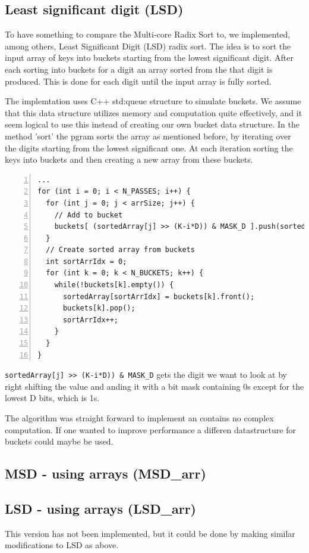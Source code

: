 \subsection{Least significant digit (LSD)}
To have something to compare the Multi-core Radix Sort to, we implemented, among others, Least Significant Digit (LSD) radix sort. 
The idea is to sort the input array of keys into buckets starting from the lowest significant digit. After each sorting into buckets for a digit an array sorted from the that digit is produced. 
This is done for each digit until the input array is fully sorted. 

The implemtation uses C++ std:queue structure to simulate buckets. We assume that this data structure utilizes memory and computation quite effectively, and it seem logical to use this instead of creating our own bucket data structure.
In the method 'sort' the pgram sorts the array as mentioned before, by iterating over the digits starting from the lowest significant one. At each iteration sorting the keys into buckets and then creating a new array from these buckets.
\begin{lstlisting}[numbers=left]
...
for (int i = 0; i < N_PASSES; i++) {
  for (int j = 0; j < arrSize; j++) {
    // Add to bucket
    buckets[ (sortedArray[j] >> (K-i*D)) & MASK_D ].push(sortedArray[j]);
  }
  // Create sorted array from buckets
  int sortArrIdx = 0;
  for (int k = 0; k < N_BUCKETS; k++) {
    while(!buckets[k].empty()) {
      sortedArray[sortArrIdx] = buckets[k].front();
      buckets[k].pop();
      sortArrIdx++;
    }
  }
}
\end{lstlisting}
\verb!sortedArray[j] >> (K-i*D)) & MASK_D! gets the digit we want to look at by right shifting the value and anding it with a bit mask containing 0s except for the lowest D bits, which is 1s.

The algorithm was straight forward to implement an contains no complex computation. If one wanted to improve performance a differen datastructure for buckets could maybe be used.


\subsection{MSD - using arrays (MSD\_arr)}


\subsection{LSD - using arrays (LSD\_arr)}
This version has not been implemented, but it could be done by making similar modifications to LSD as above.


